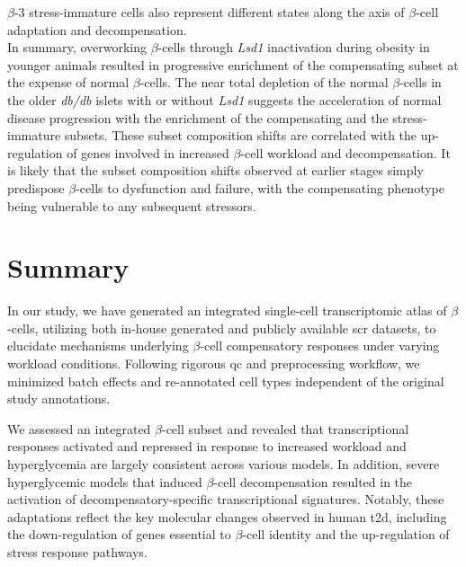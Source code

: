 $\beta$-3 stress-immature cells also represent different states along the axis of $\beta$-cell adaptation and decompensation.\\






In summary, overworking $\beta$-cells through \textit{Lsd1} inactivation during obesity in younger animals resulted in progressive enrichment of the compensating subset at the expense of normal $\beta$-cells. The near total depletion of the normal $\beta$-cells in the older \textit{db/db} islets with or without \textit{Lsd1} suggests the acceleration of normal disease progression with the enrichment of the compensating and the stress-immature subsets. These subset composition shifts are correlated with the up-regulation of genes involved in increased $\beta$-cell workload and decompensation. It is likely that the subset composition shifts observed at earlier stages simply predispose $\beta$-cells to dysfunction and failure, with the compensating phenotype being vulnerable to any subsequent stressors.

\clearpage

\section[Summary]{Summary}
\label{sec:chp3_summary}

\par In our study, we have generated an integrated single-cell transcriptomic atlas of $\beta$-cells, utilizing both in-house generated and publicly available \gls{scr} datasets, to elucidate mechanisms underlying $\beta$-cell compensatory responses under varying workload conditions. Following rigorous \gls{qc} and preprocessing workflow, we minimized batch effects and re-annotated cell types independent of the original study annotations.\\

\par We assessed an integrated $\beta$-cell subset and revealed that transcriptional responses activated and repressed in response to increased workload and hyperglycemia are largely consistent across various models. In addition, severe hyperglycemic models that induced $\beta$-cell decompensation resulted in the activation of decompensatory-specific transcriptional signatures. Notably, these adaptations reflect the key molecular changes observed in human \gls{t2d}, including the down-regulation of genes essential to $\beta$-cell identity and the up-regulation of stress response pathways.\\

